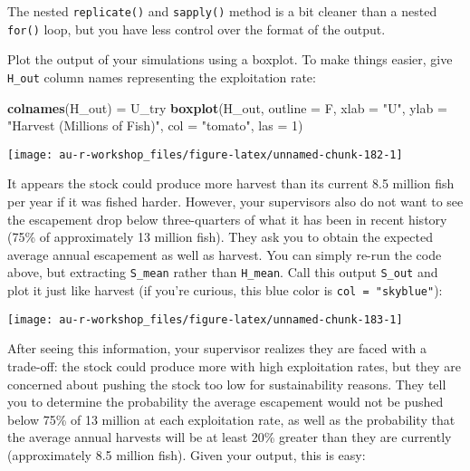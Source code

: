 \documentclass[]{book}
\newenvironment{Shaded}{\begin{snugshade}}{\end{snugshade}}
\newcommand{\KeywordTok}[1]{\textcolor[rgb]{0.13,0.29,0.53}{\textbf{#1}}}
\newcommand{\DataTypeTok}[1]{\textcolor[rgb]{0.13,0.29,0.53}{#1}}
\newcommand{\DecValTok}[1]{\textcolor[rgb]{0.00,0.00,0.81}{#1}}
\newcommand{\StringTok}[1]{\textcolor[rgb]{0.31,0.60,0.02}{#1}}
\newcommand{\NormalTok}[1]{#1}
\theoremstyle{definition}
\theoremstyle{definition}
\theoremstyle{definition}
\theoremstyle{remark}
\begin{document}
The nested \texttt{replicate()} and \texttt{sapply()} method is a bit
cleaner than a nested \texttt{for()} loop, but you have less control
over the format of the output.

Plot the output of your simulations using a boxplot. To make things
easier, give \texttt{H\_out} column names representing the exploitation
rate:

\begin{Shaded}
\begin{Highlighting}[]
\KeywordTok{colnames}\NormalTok{(H_out) =}\StringTok{ }\NormalTok{U_try}
\KeywordTok{boxplot}\NormalTok{(H_out, }\DataTypeTok{outline =}\NormalTok{ F,}
        \DataTypeTok{xlab =} \StringTok{"U"}\NormalTok{, }\DataTypeTok{ylab =} \StringTok{"Harvest (Millions of Fish)"}\NormalTok{,}
        \DataTypeTok{col =} \StringTok{"tomato"}\NormalTok{, }\DataTypeTok{las =} \DecValTok{1}\NormalTok{)}
\end{Highlighting}
\end{Shaded}

\begin{center}\texttt{[image: au-r-workshop\_files/figure-latex/unnamed-chunk-182-1]} \end{center}

It appears the stock could produce more harvest than its current 8.5
million fish per year if it was fished harder. However, your supervisors
also do not want to see the escapement drop below three-quarters of what
it has been in recent history (75\% of approximately 13 million fish).
They ask you to obtain the expected average annual escapement as well as
harvest. You can simply re-run the code above, but extracting
\texttt{S\_mean} rather than \texttt{H\_mean}. Call this output
\texttt{S\_out} and plot it just like harvest (if you're curious, this
blue color is \texttt{col\ =\ "skyblue"}):

\begin{center}\texttt{[image: au-r-workshop\_files/figure-latex/unnamed-chunk-183-1]} \end{center}

After seeing this information, your supervisor realizes they are faced
with a trade-off: the stock could produce more with high exploitation
rates, but they are concerned about pushing the stock too low for
sustainability reasons. They tell you to determine the probability the
average escapement would not be pushed below 75\% of 13 million at each
exploitation rate, as well as the probability that the average annual
harvests will be at least 20\% greater than they are currently
(approximately 8.5 million fish). Given your output, this is easy:
\end{document}
